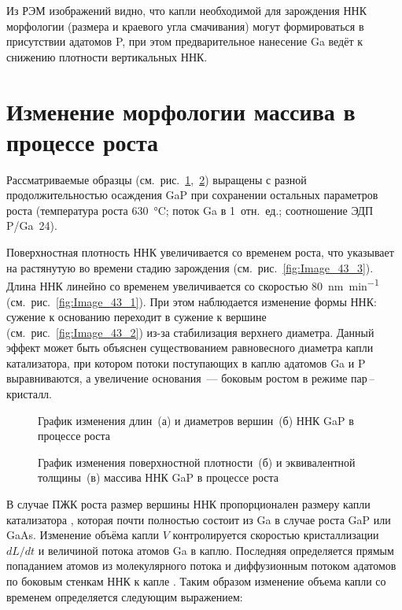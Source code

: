 Из РЭМ изображений видно, что капли необходимой для зарождения ННК морфологии
(размера и краевого угла смачивания) могут формироваться в присутствии адатомов
P, при этом предварительное нанесение Ga ведёт к снижению плотности
вертикальных ННК.

\section{Изменение морфологии массива в процессе роста}\label{sec:ch5/sec3}

Рассматриваемые образцы
(см.~рис.~\cref{fig:Image_43_12},~\cref{fig:Image_43_34}) выращены с разной продолжительностью осаждения GaP при сохранении остальных параметров роста (температура
роста 630~\si{\degreeCelsius}; поток Ga в 1~отн.~ед.; соотношение ЭДП P/Ga~24).

Поверхностная плотность ННК увеличивается со временем роста, что указывает на растянутую во времени стадию зарождения (см.~рис.~\cref{fig:Image_43_3}).
Длина ННК линейно со временем увеличивается со скоростью
80~\si{\nano\meter\per\minute} (см.~рис.~\cref{fig:Image_43_1}). При этом
наблюдается изменение формы ННК: сужение к основанию переходит в сужение к
вершине (см.~рис.~\cref{fig:Image_43_2}) из-за стабилизация верхнего диаметра. Данный эффект может быть объяснен существованием равновесного диаметра капли катализатора, при
котором потоки поступающих в каплю адатомов Ga и P выравниваются, а увеличение
основания~--- боковым ростом в режиме пар\,--\,кристалл.

\begin{figure}[ht]
\caption{График изменения длин~(а) и диаметров вершин~(б) ННК GaP в процессе роста}
\label{fig:Image_43_12}
\end{figure}

\begin{figure}[ht]
\caption{График изменения поверхностной плотности~(б) и эквивалентной толщины~(в) массива ННК
GaP в процессе роста}
\label{fig:Image_43_34}
\end{figure}

В случае ПЖК роста размер вершины ННК пропорционален размеру капли катализатора
\cite{glas2010vapor}, которая почти полностью состоит из Ga в случае роста GaP
или GaAs. Изменение объёма капли \(V\) контролируется скоростью кристаллизации
\(dL/dt\) и величиной потока атомов Ga в каплю. Последняя определяется прямым
попаданием атомов из молекулярного потока и диффузионным потоком адатомов по
боковым стенкам ННК к капле \cite{glas2010vapor}. Таким образом изменение объема капли со временем определяется следующим выражением:

